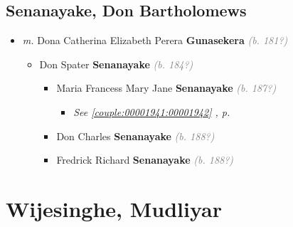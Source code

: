 \documentclass[10pt, openany]{book}
\begin{document}
\chapter{Senanayake, Don Bartholomews}
\label{00003597}
\textcolor{slmaroon}{\textit{}}
\begin{itemize}
\item{\textit{m.} Dona Catherina Elizabeth Perera \textbf{Gunasekera} \textcolor{gray}{\textit{(b. 181?)}}   \label{couple:00003597:00003598} \begin{itemize}
\item{Don Spater \textbf{Senanayake} \textcolor{gray}{\textit{(b. 184?)}}
\begin{itemize}
\item{Maria Francess Mary Jane \textbf{Senanayake} \textcolor{gray}{\textit{(b. 187?)}}
\begin{itemize}
\item{\textcolor{slteal}{\textit{See  \autoref{couple:00001941:00001942} \textit{, p. \pageref{couple:00001941:00001942} }}}}
\end{itemize}
    }
\item{Don Charles \textbf{Senanayake} \textcolor{gray}{\textit{(b. 188?)}}
  }
\item{Fredrick Richard \textbf{Senanayake} \textcolor{gray}{\textit{(b. 188?)}}
  }
\end{itemize}
  }
\end{itemize}}
\end{itemize}
  
\part{Wijesinghe, Mudliyar}
\end{document}
